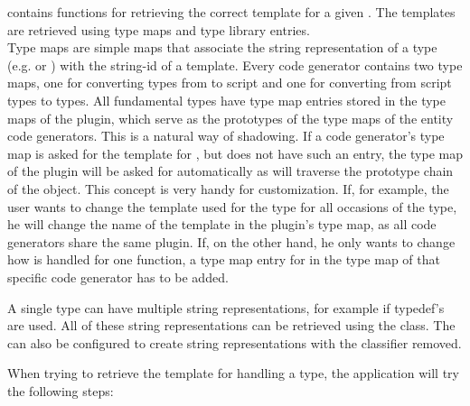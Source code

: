  contains functions for retrieving the correct template for a given . The templates are retrieved using type maps and type library entries.\\
Type maps are simple maps that associate the string representation of a type (e.g.  or ) with the string-id of a template. Every code generator contains two type maps, one for converting types from  to script and one for converting from script types to  types. All fundamental  types have type map entries stored in the type maps of the plugin, which serve as the  prototypes of the type maps of the entity code generators. This is a natural way of shadowing. If a code generator's type map is asked for the template for , but does not have such an entry, the type map of the plugin will be asked for  automatically as  will traverse the prototype chain of the object. This concept is very handy for customization. If, for example, the user wants to change the template used for the  type for all occasions of the type, he will change the name of the template in the plugin's type map, as all code generators share the same plugin. If, on the other hand, he only wants to change how  is handled for one function, a type map entry for  in the type map of that specific code generator has to be added.

A single type can have multiple string representations, for example if typedef's are used. All of these string representations can be retrieved using the  class. The  can also be configured to create string representations with the  classifier removed.

When trying to retrieve the template for handling a type, the application will try the following steps:

